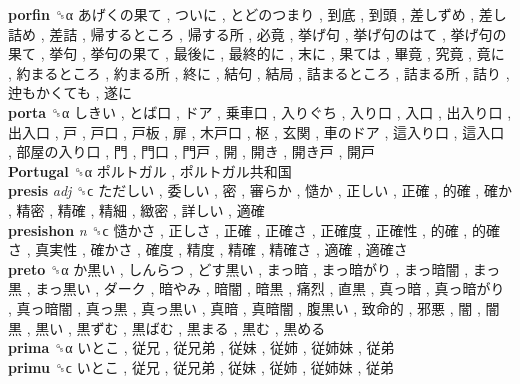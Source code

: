 \textbf{porfin} ␝α   あげくの果て ,  ついに ,  とどのつまり ,  到底 ,  到頭 ,  差しずめ ,  差し詰め ,  差詰 ,  帰するところ ,  帰する所 ,  必竟 ,  挙げ句 ,  挙げ句のはて ,  挙げ句の果て ,  挙句 ,  挙句の果て ,  最後に ,  最終的に ,  末に ,  果ては ,  畢竟 ,  究竟 ,  竟に ,  約まるところ ,  約まる所 ,  終に ,  結句 ,  結局 ,  詰まるところ ,  詰まる所 ,  詰り ,  迚もかくても ,  遂に   \\
\textbf{porta} ␝α   しきい ,  とば口 ,  ドア ,  乗車口 ,  入りぐち ,  入り口 ,  入口 ,  出入り口 ,  出入口 ,  戸 ,  戸口 ,  戸板 ,  扉 ,  木戸口 ,  枢 ,  玄関 ,  車のドア ,  這入り口 ,  這入口 ,  部屋の入り口 ,  門 ,  門口 ,  門戸 ,  開 ,  開き ,  開き戸 ,  開戸   \\
\textbf{Portugal} ␝α   ポルトガル ,  ポルトガル共和国   \\
\textbf{presis} \emph{adj}  ␝ϲ   ただしい ,  委しい ,  密 ,  審らか ,  慥か ,  正しい ,  正確 ,  的確 ,  確か ,  精密 ,  精確 ,  精細 ,  緻密 ,  詳しい ,  適確   \\
\textbf{presishon} \emph{n}  ␝ϲ   慥かさ ,  正しさ ,  正確 ,  正確さ ,  正確度 ,  正確性 ,  的確 ,  的確さ ,  真実性 ,  確かさ ,  確度 ,  精度 ,  精確 ,  精確さ ,  適確 ,  適確さ   \\
\textbf{preto} ␝α   か黒い ,  しんらつ ,  どす黒い ,  まっ暗 ,  まっ暗がり ,  まっ暗闇 ,  まっ黒 ,  まっ黒い ,  ダーク ,  暗やみ ,  暗闇 ,  暗黒 ,  痛烈 ,  直黒 ,  真っ暗 ,  真っ暗がり ,  真っ暗闇 ,  真っ黒 ,  真っ黒い ,  真暗 ,  真暗闇 ,  腹黒い ,  致命的 ,  邪悪 ,  闇 ,  闇黒 ,  黒い ,  黒ずむ ,  黒ばむ ,  黒まる ,  黒む ,  黒める   \\
\textbf{prima} ␝α   いとこ ,  従兄 ,  従兄弟 ,  従妹 ,  従姉 ,  従姉妹 ,  従弟   \\
\textbf{primu} ␝ϲ   いとこ ,  従兄 ,  従兄弟 ,  従妹 ,  従姉 ,  従姉妹 ,  従弟   \\
